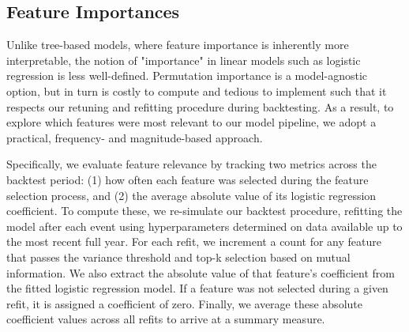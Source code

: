 \documentclass[12pt,twoside]{report}
\begin{document}
\subsection{Feature Importances}

Unlike tree-based models, where feature importance is inherently more interpretable, the notion of "importance" in linear models such as logistic regression is less well-defined. Permutation importance is a model-agnostic option, but in turn is costly to compute and tedious to implement such that it respects our retuning and refitting procedure during backtesting. As a result, to explore which features were most relevant to our model pipeline, we adopt a practical, frequency- and magnitude-based approach.

Specifically, we evaluate feature relevance by tracking two metrics across the backtest period: (1) how often each feature was selected during the feature selection process, and (2) the average absolute value of its logistic regression coefficient. To compute these, we re-simulate our backtest procedure, refitting the model after each event using hyperparameters determined on data available up to the most recent full year. For each refit, we increment a count for any feature that passes the variance threshold and top-k selection based on mutual information. We also extract the absolute value of that feature’s coefficient from the fitted logistic regression model. If a feature was not selected during a given refit, it is assigned a coefficient of zero. Finally, we average these absolute coefficient values across all refits to arrive at a summary measure.
\end{document}
